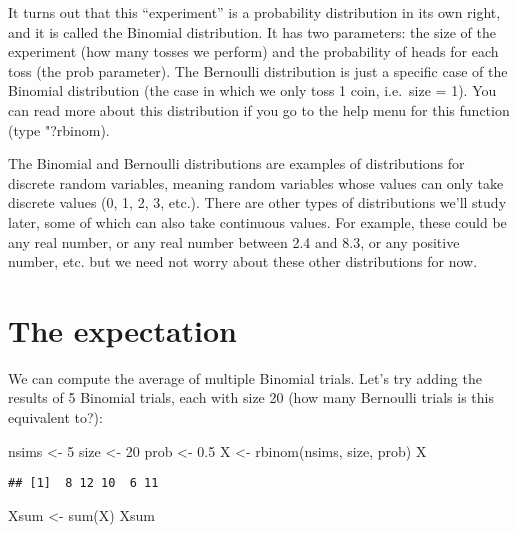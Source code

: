 \documentclass[
]{book}
\newenvironment{Shaded}{\begin{snugshade}}{\end{snugshade}}
\newcommand{\DecValTok}[1]{\textcolor[rgb]{0.00,0.00,0.81}{#1}}
\newcommand{\FloatTok}[1]{\textcolor[rgb]{0.00,0.00,0.81}{#1}}
\newcommand{\FunctionTok}[1]{\textcolor[rgb]{0.00,0.00,0.00}{#1}}
\newcommand{\NormalTok}[1]{#1}
\newcommand{\OtherTok}[1]{\textcolor[rgb]{0.56,0.35,0.01}{#1}}
\begin{document}
It turns out that this ``experiment'' is a probability distribution in its own right, and it is called the Binomial distribution. It has two parameters: the size of the experiment (how many tosses we perform) and the probability of heads for each toss (the prob parameter). The Bernoulli distribution is just a specific case of the Binomial distribution (the case in which we only toss 1 coin, i.e.~size = 1). You can read more about this distribution if you go to the help menu for this function (type "?rbinom).

The Binomial and Bernoulli distributions are examples of distributions for discrete random variables, meaning random variables whose values can only take discrete values (0, 1, 2, 3, etc.). There are other types of distributions we'll study later, some of which can also take continuous values. For example, these could be any real number, or any real number between 2.4 and 8.3, or any positive number, etc. but we need not worry about these other distributions for now.

\hypertarget{the-expectation}{%
\section{The expectation}\label{the-expectation}}

We can compute the average of multiple Binomial trials. Let's try adding the results of 5 Binomial trials, each with size 20 (how many Bernoulli trials is this equivalent to?):

\begin{Shaded}
\begin{Highlighting}[]
\NormalTok{nsims }\OtherTok{\textless{}{-}} \DecValTok{5}
\NormalTok{size }\OtherTok{\textless{}{-}} \DecValTok{20}
\NormalTok{prob }\OtherTok{\textless{}{-}} \FloatTok{0.5}
\NormalTok{X }\OtherTok{\textless{}{-}} \FunctionTok{rbinom}\NormalTok{(nsims, size, prob)}
\NormalTok{X}
\end{Highlighting}
\end{Shaded}

\begin{verbatim}
## [1]  8 12 10  6 11
\end{verbatim}

\begin{Shaded}
\begin{Highlighting}[]
\NormalTok{Xsum }\OtherTok{\textless{}{-}} \FunctionTok{sum}\NormalTok{(X)}
\NormalTok{Xsum}
\end{Highlighting}
\end{Shaded}
\end{document}
